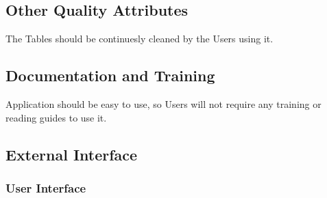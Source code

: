 \documentclass[14pt]{extarticle}
\begin{document}
\subsection{Other Quality Attributes}
The Tables should be continuesly cleaned by the Users using it.
\subsection{Documentation and Training}
Application should be easy to use, so Users will not require any training or reading guides to use it.
\subsection{External Interface}
\subsubsection{User Interface}
\end{document}
